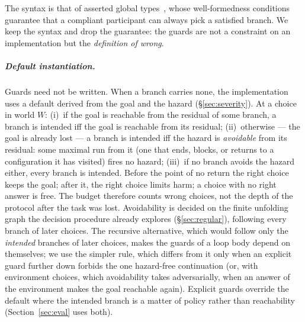 \documentclass[a4paper,UKenglish,cleveref,autoref,thm-restate,anonymous]{lipics-v2021}
\begin{document}
The syntax is that of asserted global types~\cite{bocchi-concur10}, whose
well-formedness conditions guarantee that a compliant participant can always
pick a satisfied branch. We keep the syntax and drop the guarantee: the guards
are not a constraint on an implementation but the \emph{definition of wrong}.

\subparagraph*{Default instantiation.}
Guards need not be written. When a branch carries none, the implementation
uses a default derived from the goal and the hazard (\S\ref{sec:severity}).
At a choice in world $W$:
(i)~if the goal is reachable from the residual of some branch, a branch is
intended iff the goal is reachable from its residual;
(ii)~otherwise --- the goal is already lost --- a branch is intended iff the
hazard is \emph{avoidable} from its residual: some maximal run from it (one
that ends, blocks, or returns to a configuration it has visited) fires no
hazard;
(iii)~if no branch avoids the hazard either, every branch is intended.
Before the point of no return the right choice keeps the goal; after it, the
right choice limits harm; a choice with no right answer is free. The budget
therefore counts wrong choices, not the depth of the protocol after the task
was lost. Avoidability is decided on the finite unfolding graph the decision
procedure already explores (\S\ref{sec:regular}), following every branch of
later choices. The recursive alternative, which would follow only the
\emph{intended} branches of later choices, makes the guards of a loop body
depend on themselves; we use the simpler rule, which differs from it only when
an explicit guard further down forbids the one hazard-free continuation (or,
with environment choices, which avoidability takes adversarially, when an
answer of the environment makes the goal reachable again).
Explicit guards override the default where the intended branch is a matter of
policy rather than reachability (Section~\ref{sec:eval} uses both).
\end{document}
